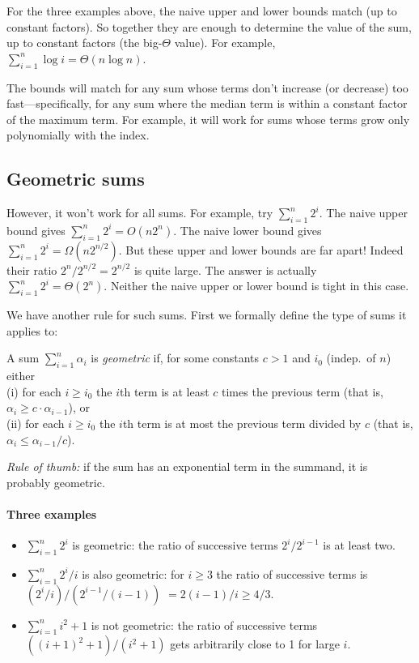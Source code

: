 For the three examples above, the naive upper and lower bounds match (up to constant factors).
So together they are enough to determine the value of the sum, up to constant factors (the big-$\Theta$ value).
For example, $\sum_{i=1}^n \log i = \Theta(n\log n)$.

The bounds will match for any sum whose terms don't increase (or decrease) too fast---specifically, for any sum where the median term is within a constant factor
of the maximum term.
For example, it will work for sums whose terms grow only polynomially with the index.


\subsection{Geometric sums}
However, it won't work for all sums.
For example, try $\sum_{i=1}^n 2^i$.
The naive upper bound gives $\sum_{i=1}^n 2^i = O(n 2^n)$.
The naive lower bound gives $\sum_{i=1}^n 2^i = \Omega(n 2^{n/2})$.
But these upper and lower bounds are far apart!
Indeed their ratio $2^n / 2^{n/2} = 2^{n/2}$ is quite large.
The answer is actually $\sum_{i=1}^n 2^i = \Theta(2^n)$.
Neither the naive upper or lower bound is tight in this case.

We have another rule for such sums.  First we 
formally define the type of sums it applies to:
\begin{definition}
  A sum $\sum_{i=1}^n \alpha_i$ is \emph{geometric} if,
  for some constants $c>1$ and $i_0$ (indep.~of $n$)
  either\\ (i) for each $i\ge i_0$ the $i$th term
  is at least $c$ times the previous term
  (that is, $\alpha_{i} \ge c \cdot \alpha_{i-1}$), or \\
  (ii) for each $i\ge i_0$ the $i$th term
  is at most the previous term divided by $c$
  (that is, $\alpha_{i} \le \alpha_{i-1}/c$).
\end{definition}

\emph{Rule of thumb:} if the sum has an exponential term in the summand, it is probably geometric.

\paragraph{Three examples}
\begin{itemize}
\item $\sum_{i=1}^n 2^i$ is geometric:
  the ratio of successive terms $2^{i}/ 2^{i-1}$ is at least two.
\item $\sum_{i=1}^n 2^i/i$ is also geometric:
  for $i\ge 3$ the ratio of successive terms is $(2^i/i)/(2^{i-1}/(i-1))$ $=2(i-1)/i\ge 4/3$.
\item $\sum_{i=1}^n i^2+1$ is not geometric:
  the ratio of successive terms $((i+1)^2+1) / (i^2 +1)$
  gets arbitrarily close to 1 for large $i$.
\end{itemize}



